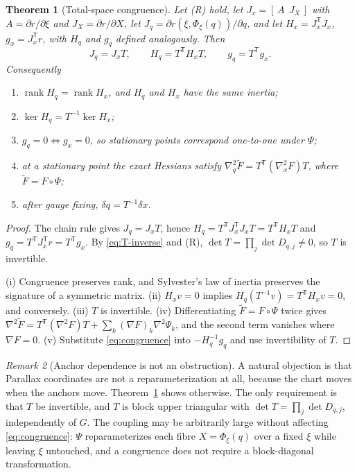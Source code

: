 \documentclass[11pt,a4paper]{article}
\newtheorem{theorem}{Theorem}
\theoremstyle{definition}
\theoremstyle{remark}
\newtheorem{remark}[theorem]{Remark}
\DeclareMathOperator{\rank}{rank}
\newcommand{\T}{\mathsf{T}}
\begin{document}
\begin{theorem}[Total-space congruence]\label{thm:congruence}
Let (R) hold, let $J_x=[\,A\ \ J_X\,]$ with $A=\partial r/\partial\xi$ and $J_X=\partial r/\partial X$, let $J_q=\partial r(\xi,\Phi_\xi(q))/\partial q$, and let $H_x=J_x^{\T}J_x$, $g_x=J_x^{\T}r$, with $H_q$ and $g_q$ defined analogously. Then
\begin{equation}
J_q=J_xT,\qquad H_q=T^{\T}H_xT,\qquad g_q=T^{\T}g_x .
\label{eq:congruence}
\end{equation}
Consequently
\begin{enumerate}[label=(\roman*),leftmargin=2.4em]
  \item $\rank H_q=\rank H_x$, and $H_q$ and $H_x$ have the same inertia;
  \item $\ker H_q=T^{-1}\ker H_x$;
  \item $g_q=0\iff g_x=0$, so stationary points correspond one-to-one under $\Psi$;
  \item at a stationary point the exact Hessians satisfy $\nabla^2_q\tilde F=T^{\T}(\nabla^2_xF)T$, where $\tilde F=F\circ\Psi$;
  \item after gauge fixing, $\delta q=T^{-1}\delta x$.
\end{enumerate}
\end{theorem}
\begin{proof}
The chain rule gives $J_q=J_xT$, hence $H_q=T^{\T}J_x^{\T}J_xT=T^{\T}H_xT$ and $g_q=T^{\T}J_x^{\T}r=T^{\T}g_x$. By \eqref{eq:T-inverse} and (R), $\det T=\prod_j\det D_{q,j}\neq0$, so $T$ is invertible.

(i) Congruence preserves rank, and Sylvester's law of inertia preserves the signature of a symmetric matrix. (ii) $H_xv=0$ implies $H_q(T^{-1}v)=T^{\T}H_xv=0$, and conversely. (iii) $T$ is invertible. (iv) Differentiating $\tilde F=F\circ\Psi$ twice gives $\nabla^2\tilde F=T^{\T}(\nabla^2F)T+\sum_k(\nabla F)_k\nabla^2\Psi_k$, and the second term vanishes where $\nabla F=0$. (v) Substitute \eqref{eq:congruence} into $-H_q^{-1}g_q$ and use invertibility of $T$.
\end{proof}

\begin{remark}[Anchor dependence is not an obstruction]\label{rem:anchors}
A natural objection is that Parallax coordinates are not a reparameterization at all, because the chart moves when the anchors move. Theorem~\ref{thm:congruence} shows otherwise. The only requirement is that $T$ be invertible, and $T$ is block upper triangular with $\det T=\prod_j\det D_{q,j}$, independently of $G$. The coupling may be arbitrarily large without affecting \eqref{eq:congruence}: $\Psi$ reparameterizes each fibre $X=\Phi_\xi(q)$ over a fixed $\xi$ while leaving $\xi$ untouched, and a congruence does not require a block-diagonal transformation.
\end{remark}
\end{document}
